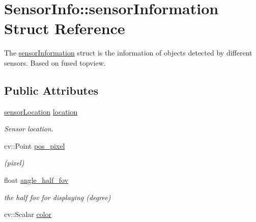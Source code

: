 \hypertarget{struct_sensor_info_1_1sensor_information}{}\section{Sensor\+Info\+:\+:sensor\+Information Struct Reference}
\label{struct_sensor_info_1_1sensor_information}


The \hyperlink{struct_sensor_info_1_1sensor_information}{sensor\+Information} struct is the information of objects detected by different sensors. Based on fused topview.  


\subsection*{Public Attributes}
\begin{DoxyCompactItemize}
\item 
\hypertarget{struct_sensor_info_1_1sensor_information_a9300fecc3b74cc149202d70c874d840c}{}\hyperlink{struct_sensor_info_1_1sensor_location}{sensor\+Location} \hyperlink{struct_sensor_info_1_1sensor_information_a9300fecc3b74cc149202d70c874d840c}{location}\label{struct_sensor_info_1_1sensor_information_a9300fecc3b74cc149202d70c874d840c}

\begin{DoxyCompactList}\small\item\em Sensor location. \end{DoxyCompactList}\item 
\hypertarget{struct_sensor_info_1_1sensor_information_ac5115526324b21d66096874295e73a4f}{}cv\+::\+Point \hyperlink{struct_sensor_info_1_1sensor_information_ac5115526324b21d66096874295e73a4f}{pos\+\_\+pixel}\label{struct_sensor_info_1_1sensor_information_ac5115526324b21d66096874295e73a4f}

\begin{DoxyCompactList}\small\item\em (pixel) \end{DoxyCompactList}\item 
\hypertarget{struct_sensor_info_1_1sensor_information_accc99e2fca1eea964d0656c088eb7014}{}float \hyperlink{struct_sensor_info_1_1sensor_information_accc99e2fca1eea964d0656c088eb7014}{angle\+\_\+half\+\_\+fov}\label{struct_sensor_info_1_1sensor_information_accc99e2fca1eea964d0656c088eb7014}

\begin{DoxyCompactList}\small\item\em the half fov for displaying (degree) \end{DoxyCompactList}\item 
\hypertarget{struct_sensor_info_1_1sensor_information_a5d7ae95164090c060ec7e048a6b44bf6}{}cv\+::\+Scalar \hyperlink{struct_sensor_info_1_1sensor_information_a5d7ae95164090c060ec7e048a6b44bf6}{color}\label{struct_sensor_info_1_1sensor_information_a5d7ae95164090c060ec7e048a6b44bf6}


\end{DoxyCompactItemize}
